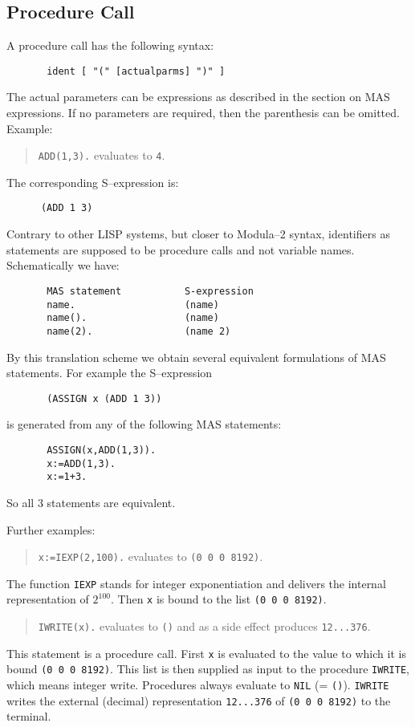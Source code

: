 \subsection{Procedure Call}

A procedure call has the following syntax:
\begin{verbatim}
       ident [ "(" [actualparms] ")" ] 
\end{verbatim}
The actual parameters can be expressions as described 
in the section on MAS expressions.
If no parameters are required, then the parenthesis can 
be omitted.   
Example:
\begin{quote}
      \verb/ADD(1,3)./ evaluates to \verb/4/.
\end{quote}

{\small
The corresponding S--expression is:
\begin{verbatim}
      (ADD 1 3)
\end{verbatim}
Contrary to other LISP systems, but closer to Modula--2 syntax, 
identifiers as statements are supposed to be 
procedure calls and not variable names.  
Schematically we have:
\begin{verbatim}
       MAS statement           S-expression
       name.                   (name)
       name().                 (name)
       name(2).                (name 2)
\end{verbatim}
By this translation scheme we obtain several equivalent
formulations of MAS statements. 
For example the S--expression 
\begin{verbatim}
       (ASSIGN x (ADD 1 3))
\end{verbatim}
is generated from any of the following MAS statements:
\begin{verbatim}
       ASSIGN(x,ADD(1,3)).
       x:=ADD(1,3).
       x:=1+3.
\end{verbatim}
So all 3 statements are equivalent.  
}

Further examples:
\begin{quote}
      \verb/x:=IEXP(2,100)./ evaluates to \verb/(0 0 0 8192)/.
\end{quote}
The function \verb/IEXP/ stands for integer exponentiation and
delivers the internal representation of $2^{100}$.
Then \verb/x/ is bound to the list \verb/(0 0 0 8192)/.
\begin{quote}
      \verb/IWRITE(x)./ evaluates to \verb/()/ and as a side effect
      produces \verb/12...376/.
\end{quote}
This statement is a procedure call. 
First \verb/x/ is evaluated to the value to which it is bound
\verb/(0 0 0 8192)/. This list is then supplied as input to 
the procedure \verb/IWRITE/, which means integer write.
Procedures always evaluate to \verb/NIL/ (= \verb/()/).
\verb/IWRITE/ writes the external (decimal) representation 
\verb/12...376/
of \verb/(0 0 0 8192)/ to the terminal.


